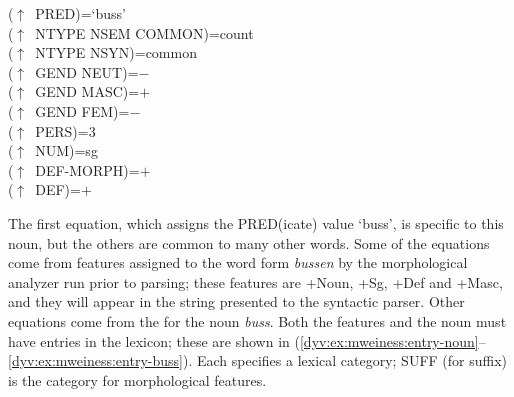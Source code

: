 \documentclass[output=paper]{langsci/langscibook}
\begin{document}


\ea\label{dyv:ex:mweiness:f-descr-bussen}
{\sffamily 
($\uparrow$~PRED)=`buss' \\
($\uparrow$~NTYPE NSEM COMMON)=count \\
($\uparrow$~NTYPE NSYN)=common \\
($\uparrow$~GEND NEUT)=$-$ \\
($\uparrow$~GEND MASC)=$+$ \\
($\uparrow$~GEND FEM)=$-$ \\
($\uparrow$~PERS)=3 \\
($\uparrow$~NUM)=sg \\
($\uparrow$~DEF-MORPH)=$+$ \\
($\uparrow$~DEF)=$+$ \\
}
\z

The first equation, which assigns the \textsf{PRED}(icate) value \textsf{`buss'}, is specific to this noun, but the others are common to many other words.
Some of the equations come from features assigned to the word form \textit{bussen} by the morphological analyzer run prior to parsing; these features are \textsf{+Noun}, \textsf{+Sg}, \textsf{+Def} and \textsf{+Masc}, and they will appear in the string presented to the syntactic parser.
Other equations come from the  for the noun  \textit{buss}.
Both the features and the noun must have entries in the lexicon;  these are shown in (\ref{dyv:ex:mweiness:entry-noun}--\ref{dyv:ex:mweiness:entry-buss}).
Each  specifies a lexical category; \textsf{SUFF} (for suffix) is the category for morphological features.
\end{document}
